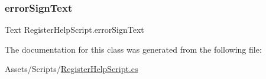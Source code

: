\subsubsection{\texorpdfstring{error\+Sign\+Text}{errorSignText}}
{\footnotesize\ttfamily Text Register\+Help\+Script.\+error\+Sign\+Text}



The documentation for this class was generated from the following file\+:\begin{DoxyCompactItemize}
\item 
Assets/\+Scripts/\hyperlink{RegisterHelpScript_8cs}{Register\+Help\+Script.\+cs}\end{DoxyCompactItemize}
